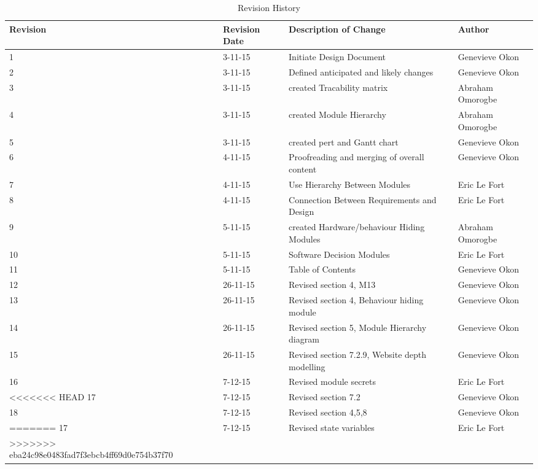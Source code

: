 \documentclass[titlepage]{article}
\begin{document}
\begin{table}[h!]
	\begin{tabular}{| p{5cm} | p{5cm} | p{5cm} |p{5cm} |}    \hline
Revision  &Revision Date &Description of Change &Author\\ \hline
1& 3-11-15& Initiate Design Document&Genevieve Okon\\ \hline
2& 3-11-15& Defined anticipated and likely changes&Genevieve Okon\\ \hline
3& 3-11-15& created Tracability matrix &Abraham Omorogbe\\ \hline
4& 3-11-15& created  Module Hierarchy&Abraham Omorogbe\\ \hline
5& 3-11-15&created pert and Gantt chart&Genevieve Okon\\ \hline
6& 4-11-15& Proofreading and merging of overall content&Genevieve Okon\\ \hline
7& 4-11-15& Use Hierarchy Between Modules&Eric Le Fort\\ \hline
8& 4-11-15&Connection Between Requirements and Design&Eric Le Fort\\ \hline
9& 5-11-15& created Hardware/behaviour Hiding Modules&Abraham Omorogbe\\ \hline
10& 5-11-15& Software Decision Modules&Eric Le Fort\\ \hline
11& 5-11-15& Table of Contents&Genevieve Okon\\ \hline


12& 26-11-15&Revised section 4, M13&Genevieve Okon\\ \hline
13& 26-11-15&Revised section 4, Behaviour hiding module&Genevieve Okon\\ \hline
14& 26-11-15&Revised section 5, Module Hierarchy diagram&Genevieve Okon\\ \hline
15& 26-11-15&Revised section 7.2.9, Website depth modelling&Genevieve Okon\\ \hline
16& 7-12-15& Revised module secrets& Eric Le Fort \\ \hline
<<<<<<< HEAD
17& 7-12-15&Revised section 7.2&Genevieve Okon\\ \hline
18& 7-12-15&Revised section 4,5,8 &Genevieve Okon\\ \hline
=======
17& 7-12-15& Revised state variables& Eric Le Fort \\ \hline
>>>>>>> eba24c98e0483fad7f3ebcb4ff69d0e754b37f70
       \end{tabular}
       
       \caption{Revision History}
       \label{table:Revision History}
\end{table}
\end{document}

